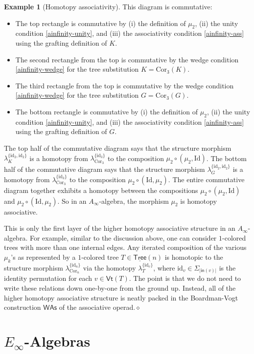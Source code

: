 \documentclass[11pt]{amsbook}
\numberwithin{section}{chapter}
\numberwithin{subsection}{section}
\numberwithin{equation}{section}
\theoremstyle{plain}
\theoremstyle{definition}
\newtheorem{example}[equation]{Example}
\newcommand{\Cor}{\mathrm{Cor}}
\newcommand{\Vt}{\mathsf{Vt}}
\newcommand{\W}{\mathsf{W}}
\newcommand{\Id}{\mathrm{Id}}
\newcommand{\id}{\mathrm{id}}
\newcommand{\dqed}{\hfill$\diamond$}
\newcommand{\As}{\mathsf{As}}
\newcommand{\Was}{\W\As}
\newcommand{\Tree}{\mathsf{Tree}}
\newcommand{\uTree}{\underline{\Tree}}
\newcommand{\inp}{\mathsf{in}}
\begin{document}
\begin{example}[Homotopy associativity]
This diagram is commutative:
\begin{itemize}
\item The top rectangle is commutative by (i) the definition of $\mu_2$, (ii) the unity condition \eqref{ainfinity-unity}, and (iii) the associativity condition \eqref{ainfinity-ass} using the grafting definition of $K$.
\item The second rectangle from the top is commutative by the wedge condition \eqref{ainfinity-wedge} for the tree substitution $K=\Cor_3(K)$.
\item The third rectangle from the top is commutative by the wedge condition \eqref{ainfinity-wedge} for the tree substitution $G=\Cor_3(G)$.
\item The bottom rectangle is commutative by (i) the definition of $\mu_2$, (ii) the unity condition \eqref{ainfinity-unity}, and (iii) the associativity condition \eqref{ainfinity-ass} using the grafting definition of $G$.
\end{itemize}
The top half of the commutative diagram says that the structure morphism $\lambda_K^{\{\id_2,\id_2\}}$ is a homotopy from $\lambda_{\Cor_3}^{\{\id_3\}}$ to the composition $\mu_2\circ(\mu_2,\Id)$.  The bottom half of the commutative diagram says that the structure morphism $\lambda_G^{\{\id_2,\id_2\}}$ is a homotopy from $\lambda_{\Cor_3}^{\{\id_3\}}$ to the composition $\mu_2\circ(\Id,\mu_2)$.  The entire commutative diagram together exhibits a homotopy between the compositions $\mu_2\circ(\mu_2,\Id)$ and $\mu_2\circ(\Id,\mu_2)$.  So in an $A_\infty$-algebra, the morphism $\mu_2$ is homotopy associative.  

This is only the first layer of the higher homotopy associative structure in an $A_\infty$-algebra.  For example, similar to the discussion above, one can consider $1$-colored trees with more than one internal edges.  Any iterated composition of the various $\mu_k$'s as represented by a $1$-colored tree $T \in \uTree(n)$ is homotopic to the structure morphism $\lambda_{\Cor_n}^{\{\id_n\}}$ via the homotopy $\lambda_T^{\{\id_v\}}$, where $\id_v\in \Sigma_{|\inp(v)|}$ is the identity permutation for each $v \in \Vt(T)$.  The point is that we do not need to write these relations down one-by-one from the ground up.  Instead, all of the higher homotopy associative structure is neatly packed in the Boardman-Vogt construction $\Was$ of the associative operad.\dqed
\end{example}


\section{$E_\infty$-Algebras}\label{sec:einfinity-algebra}
\end{document}

